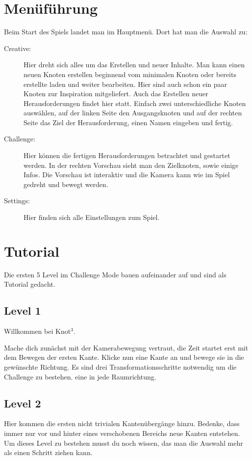 \documentclass{scrartcl}
\begin{document}
\section*{Menüführung}
Beim Start des Spiels landet man im Hauptmenü. Dort hat man die Auswahl zu:
\begin{description}
\item[Creative:] Hier dreht sich alles um das Erstellen und neuer Inhalte. Man kann einen neuen Knoten erstellen beginnend vom minimalen Knoten oder bereits erstellte laden und weiter bearbeiten.
Hier sind auch schon ein paar Knoten zur Inspiration mitgeliefert. Auch das Erstellen neuer Herausforderungen findet hier statt. Einfach zwei unterschiedliche Knoten auswählen, auf der linken Seite den Ausgangsknoten und auf der rechten Seite das Ziel der Herausforderung, einen Namen eingeben und fertig.
\item[Challenge:] Hier können die fertigen Herausforderungen betrachtet und gestartet werden. In der rechten Vorschau sieht man den Zielknoten, sowie einige Infos. Die Vorschau ist interaktiv und die Kamera kann wie im Spiel gedreht und bewegt werden.
\item[Settings:] Hier finden sich alle Einstellungen zum Spiel.
\end{description}

\section*{Tutorial}

Die ersten 5 Level im Challenge Mode bauen aufeinander auf und sind als Tutorial gedacht.

\subsection*{Level 1}
Willkommen bei Knot$^3$.

Mache dich zunächst mit der Kamerabewegung vertraut, die Zeit startet erst mit dem Bewegen der ersten Kante. Klicke nun eine Kante an und bewege sie in die gewünschte Richtung. Es sind drei Transformationsschritte notwendig um die Challenge zu bestehen. eine in jede Raumrichtung.

\subsection*{Level 2}
Hier kommen die ersten nicht trivialen Kantenübergänge hinzu. Bedenke, dass immer nur vor und hinter eines verschobenen Bereichs neue Kanten entstehen. Um dieses Level zu bestehen musst du noch wissen, das man die Auswahl mehr als einen Schritt ziehen kann.
\end{document}
